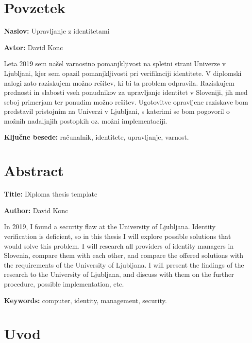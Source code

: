 \documentclass[a4paper,12pt,openright]{book}
\newcommand{\ttitle}{Upravljanje z identitetami}
\newcommand{\ttitleEn}{Diploma thesis template}
\newcommand{\tauthor}{David Konc}
\newcommand{\tkeywords}{računalnik, identitete, upravljanje, varnost}
\newcommand{\tkeywordsEn}{computer, identity, management, security}
\newcommand{\clearemptydoublepage}{\newpage{\pagestyle{empty}\cleardoublepage}}
\begin{document}
\chapter*{Povzetek}

\noindent\textbf{Naslov:} \ttitle
\bigskip

\noindent\textbf{Avtor:} \tauthor
\bigskip

\noindent Leta 2019 sem našel varnostno pomanjkljivost na spletni strani Univerze v Ljubljani, kjer sem opazil pomanjkljivosti pri verifikaciji identitete. V diplomski nalogi zato raziskujem možno rešitev, ki bi ta problem odpravila. Raziskujem prednosti in slabosti vseh ponudnikov za upravljanje identitet v Sloveniji, jih med seboj primerjam ter ponudim možno rešitev. Ugotovitve opravljene raziskave bom predstavil pristojnim na Univerzi v Ljubljani,  s katerimi se bom pogovoril o možnih nadaljnjih postopkih oz. možni implementaciji. 
\bigskip

\noindent\textbf{Ključne besede:} \tkeywords.
\clearemptydoublepage

\chapter*{Abstract}

\noindent\textbf{Title:} \ttitleEn
\bigskip

\noindent\textbf{Author:} \tauthor
\bigskip

\noindent In 2019, I found a security flaw at the University of Ljubljana. Identity verification is deficient, so in this thesis I will explore possible solutions that would solve this problem. I will research all providers of identity managers in Slovenia, compare them with each other, and compare the offered solutions with the requirements of the University of Ljubljana. I will present the findings of the research to the University of Ljubljana, and discuss with them on the further procedure, possible implementation, etc.


\bigskip

\noindent\textbf{Keywords:} \tkeywordsEn.
\clearemptydoublepage

\mainmatter
\setcounter{page}{1}
\pagestyle{fancy}

\chapter{Uvod}
\end{document}
